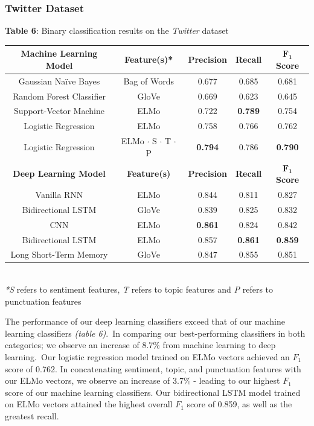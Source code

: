 \documentclass[12pt,a4paper]{article}
\begin{document}
\subsubsection{Twitter Dataset}

\begin{center}
	\textbf{Table 6}: Binary classification results on the \textit{Twitter} dataset\vspace{-5pt}
\end{center}

\begin{center}
	\begin{tabular}{c||c|c|c|c}
		\hline
		\textbf{Machine Learning Model}& \textbf{Feature(s)*} & \textbf{Precision} & \textbf{Recall} & \textbf{$\mathbf{F_1}$ Score}\\
		\hline\hline
		Gaussian Na\"{i}ve Bayes & Bag of Words & 0.677 & 0.685 & 0.681\\
		Random Forest Classifier & GloVe  & 0.669   & 0.623 & 0.645\\
		Support-Vector Machine & ELMo  & 0.722 & \textbf{0.789} & 0.754\\
		Logistic Regression & ELMo  & 0.758 & 0.766 & 0.762\\
		Logistic Regression & ELMo $\cdot$ S $\cdot$ T $\cdot$ P & \textbf{0.794} & 0.786 & \textbf{0.790}\\
		\hline\hline
		\textbf{Deep Learning Model}& \textbf{Feature(s)} & \textbf{Precision} & \textbf{Recall} & \textbf{$\mathbf{F_1}$ Score}\\
		\hline
		Vanilla RNN & ELMo  & 0.844   & 0.811 & 0.827\\
		Bidirectional LSTM & GloVe  & 0.839 & 0.825 & 0.832\\
		CNN & ELMo  & \textbf{0.861}   & 0.824 & 0.842\\
		Bidirectional LSTM & ELMo  & 0.857   & \textbf{0.861} & \textbf{0.859}\\
		Long Short-Term Memory & GloVe & 0.847   & 0.855 & 0.851\\
		\hline
	\end{tabular}
	\\\vspace{5pt}
	\textit{*S} refers to sentiment features, \textit{T} refers to topic features and \textit{P} refers to punctuation features\\\vspace{-5pt}
\end{center}

\noindent The performance of our deep learning classifiers exceed that of our machine learning classifiers \textit{(table 6)}.\ In comparing our best-performing classifiers in both categories; we observe an increase of 8.7\% from machine learning to deep learning.\ Our logistic regression model trained on ELMo vectors achieved an $F_1$ score of 0.762. In concatenating sentiment, topic, and punctuation features with our ELMo vectors, we observe an increase of 3.7\% - leading to our highest $F_1$ score of our machine learning classifiers. Our bidirectional LSTM model trained on ELMo vectors attained the highest overall $F_1$ score of 0.859, as well as the greatest recall.\
\end{document}
